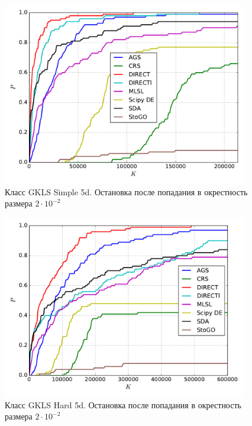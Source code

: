 \documentclass[a4paper]{article}
\begin{document}
\begin{figure}[H]
  \center
  \includegraphics[width=0.95\textwidth]{../experiments/gklss5d/cmc.pdf}
  \caption{Класс GKLS Simple 5d. Остановка после попадания в окрестность размера $2\cdot10^{-2}$}
  \label{fig:}
\end{figure}


\begin{figure}[H]
  \center
  \includegraphics[width=0.95\textwidth]{../experiments/gklsh5d/cmc.pdf}
  \caption{Класс GKLS Hard 5d. Остановка после попадания в окрестность размера $2\cdot10^{-2}$}
  \label{fig:}
\end{figure}

\end{document}
